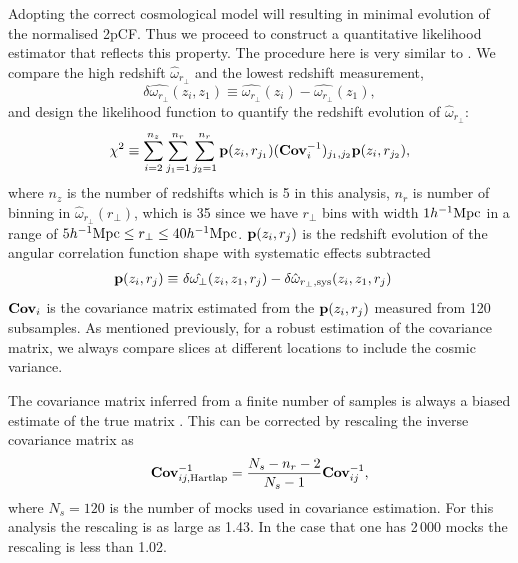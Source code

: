 \documentclass[iop]{emulateapj}
\begin{document}
Adopting the correct cosmological model will resulting in minimal evolution of the normalised 2pCF.
Thus we proceed to construct a quantitative likelihood estimator that reflects this property.
The procedure here is very similar to \cite{Li2014,Li2015,Li2016}.
We compare the high redshift $\hat\omega_{r_\perp}$ and the lowest redshift measurement,
\begin{equation}
 \delta \hat{\omega_{r_\perp}}(z_i,z_1) \equiv \hat{\omega_{r_\perp}}(z_i) - \hat{\omega_{r_\perp}}(z_1),
\end{equation}
and design the likelihood function to quantify
the redshift evolution of $\hat\omega_{r_\perp}$:
\begin{equation}\label{eq:chisq1}
\chi^2\equiv \sum_{i=2}^{n_{z}} \sum_{j_1=1}^{n_{r}} \sum_{j_2=1}^{n_{r}} {\bf p}(z_i,r_{j_1}) ({\bf Cov}_{i}^{-1})_{j_1,j_2}  {\bf p}(z_i,r_{j_2}),
\end{equation}
where $n_z$ is the number of redshifts which is 5 in this analysis, 
$n_r$ is number of binning in $\hat{\omega}_{r_\perp}(r_\perp)$,
which is 35 since we have $r_\perp$ bins 
with width $1h^{-1}\rm Mpc$ in a range of $5h^{-1}{\rm Mpc}\leq r_\perp\leq 40h^{-1}{\rm Mpc}$.
${\bf p}(z_i,r_{j})$ is the redshift evolution of the angular correlation function shape with systematic effects subtracted
\begin{eqnarray}\label{eq:bfp}
 {\bf p}(z_i,r_{j}) \equiv&\ \delta \hat{\omega_\perp}(z_i,z_1,r_j) - \delta \hat{\omega}_{r_\perp,\rm sys}(z_i,z_1,r_j)
\end{eqnarray}
${\bf Cov}_i$ is the covariance matrix estimated from the ${\bf p}(z_i,r_{j})$ measured from 120 subsamples.
As mentioned previously, for a robust estimation of the covariance matrix, 
we always compare slices at different locations to 
include the cosmic variance.

The covariance matrix inferred from a finite number of samples
is always a biased estimate of the true matrix \citep{Hartlap}.
This can be corrected by rescaling the inverse covariance matrix as 
\begin{equation}
 {\bf Cov}^{-1}_{ij,\rm Hartlap} = \frac{N_s - n_{r}-2}{N_s-1} {\bf Cov}^{-1}_{ij},
\end{equation}
where $N_s=120$ is the number of mocks used in covariance estimation.
For this analysis the rescaling is as large as 1.43.
In the case that one has 2\,000 mocks the rescaling is less than 1.02.
\end{document}
